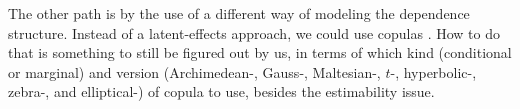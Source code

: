 The other path is by the use of a different way of modeling the
dependence structure. Instead of a latent-effects approach, we could use
copulas \cite{copulas,semiparametricSCHEIKE,gcmr,factorcopulas}. How to
do that is something to still be figured out by us, in terms of which
kind (conditional or marginal) and version (Archimedean-, Gauss-,
Maltesian-, \(t\)-, hyperbolic-, zebra-, and elliptical-) of copula to
use, besides the estimability issue.

